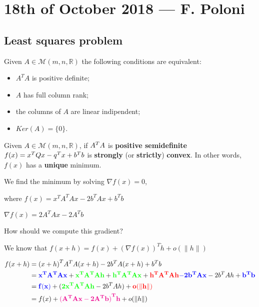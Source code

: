\documentclass[ComputationalMathematics.tex]{subfiles}
\begin{document}
\section{18th of October 2018 --- F. Poloni}


\subsection{Least squares problem}
\begin{proposition}
  Given $A \in \mathcal{M}(m, n, \mathds{R})$ the following conditions are equivalent:
  \begin{itemize}
    \item ${A}^{T}A$ is positive definite;
    \item $A$ has full column rank;
    \item the columns of $A$ are linear indipendent;
    \item $Ker(A) = \{0\}$.
  \end{itemize}
\end{proposition}

\begin{proposition}
  Given $A \in \mathcal{M}(m, n, \mathds{R})$, if ${A}^{T} A$ is \textbf{positive semidefinite} $f(x) = {x}^{T}Qx -{q}^{T}x +{b}^{T}b$ is \textbf{strongly} (or \textbf{strictly}) \textbf{convex}. In other words, $f(x)$ has a \textbf{unique} minimum.
\end{proposition}

We find the minimum by solving $\nabla f(x) = 0$, 

where $f(x) = {x}^{T}{A}^{T}Ax - 2{b}^{T}Ax + {b}^{T}b$

$\nabla  f(x) = 2 {A}^{T}Ax - 2{A}^{T}b$

How should we compute this gradient? 

We know that $f(x+h) = f(x) + {(\nabla f(x))}^{T} \dot h  + o(\|h\|)$

\begin{equation}
  \begin{split}
    f(x+h) & = {(x+h)}^{T} {A}^{T}A(x+h) - 2{b}^{T}A(x+h) +{b}^{T}b\\
    & = {\bf \color{blue} {x}^{T}{A}^{T}Ax} + {\bf \color{green} {x}^{T}{A}^{T}Ah} + {\bf \color{green} {h}^{T}{A}^{T}Ax} + {\bf \color{red} {h}^{T}{A}^{T}Ah} {\bf \color{blue}- 2{b}^{T}Ax} - 2{b}^{T}Ah + {\bf \color{blue} {b}^{T}b}\\
    & = {\bf \color{blue}f(x)} +({\bf \color{green} 2 {x}^{T}{A}^{T}Ah}-2{b}^{T}Ah) + {\bf \color{red} o(\|h\|)}\\
    & = f(x) + {\bf \color{magenta} {({A}^{T}Ax-2{A}^{T}b)}^{T}h} + o(\|h\|) 
  \end{split}
\end{equation}
\end{document}
